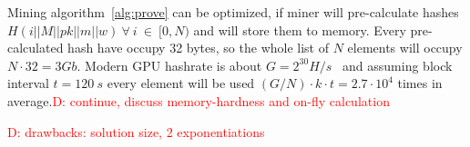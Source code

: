 \documentclass[]{article}
\newcommand{\dnote}[1]{\textcolor{red}{D: {#1}}}
\begin{document}
    Mining algorithm~\ref{alg:prove} can be optimized, if miner will pre-calculate
    hashes $H(i||M||pk||m||w)~\forall~i~\in~[0,N)$ and will store them to memory.
    Every pre-calculated hash have occupy 32 bytes, so the whole list of $N$ elements
    will occupy $N \cdot 32 = 3 Gb$.
    Modern GPU hashrate is about $G = 2^{30} H/s$~\cite{gpuHashrate} and assuming
    block interval $t=120~s$ every element will be used
    $(G / N) \cdot k \cdot t = 2.7 \cdot 10^4$ times in average.\dnote{continue, discuss memory-hardness and on-fly calculation}

    \dnote{drawbacks: solution size, 2 exponentiations}


\end{document}
